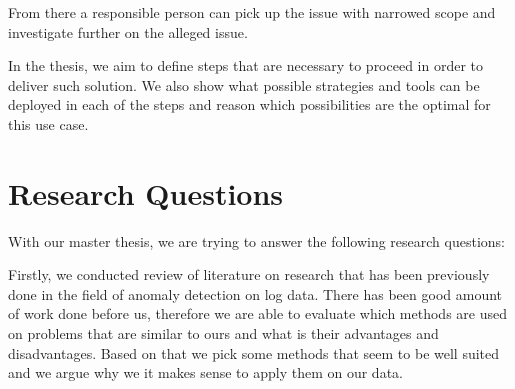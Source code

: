From there a responsible person can pick up the issue with narrowed scope and investigate further on the alleged issue.

In the thesis, we aim to define steps that are necessary to proceed in order to deliver such solution. We also show what possible strategies and tools can be deployed in each of the steps and reason which possibilities are the optimal for this use case.


\section{Research Questions}

With our master thesis, we are trying to answer the following research questions: 

Firstly, we conducted review of literature on research that has been previously done in the field of anomaly detection on log data. There has been good amount of work done before us, therefore we are able to evaluate which methods are used on problems that are similar to ours and what is their advantages and disadvantages. Based on that we pick some methods that seem to be well suited and we argue why we it makes sense to apply them on our data.\\



    

